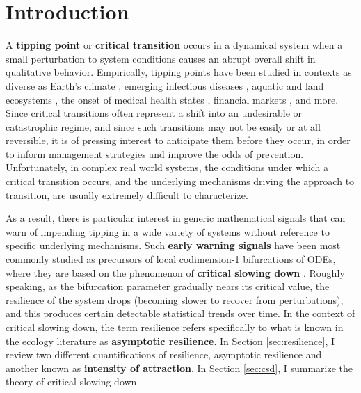 
\section{Introduction}
\label{sec:intro}

A \textbf{tipping point} or \textbf{critical transition} occurs in a dynamical system when a small perturbation to system conditions causes an abrupt overall shift in qualitative behavior. 
%
Empirically, tipping points have been studied in contexts as diverse as 
Earth's climate \cite{lentonTippingElementsEarth2008, dakosSlowingEarlyWarning2008a}, 
emerging infectious diseases \cite{brettDynamicalFootprintsEnable2020}, 
aquatic and land ecosystems \cite{schefferCatastrophicShiftsEcosystems2001, carpenterRisingVarianceLeading2006}, 
the onset of medical health states \cite{mcsharryPredictionEpilepticSeizures2003, venegasSelforganizedPatchinessAsthma2005}, 
financial markets \cite{gatfaouiFlickeringInformationSpreading2019},
and more. %
%
Since critical transitions often represent a shift into an undesirable or catastrophic regime, and since such transitions may not be easily or at all reversible, %
it is of pressing interest to anticipate them before they occur, in order to inform management strategies and improve the odds of prevention. Unfortunately, in complex real world systems, the conditions under which a critical transition occurs, and the underlying mechanisms driving the approach to transition, are usually extremely difficult to characterize.

As a result, there is particular interest in generic mathematical signals that can warn of impending tipping in a wide variety of systems without reference to specific underlying mechanisms. Such \textbf{early warning signals} have been most commonly studied as precursors of local codimension-1 bifurcations of ODEs, where they are based on the phenomenon of \textbf{critical slowing down} \cite{schefferEarlywarningSignalsCritical2009}. Roughly speaking, as the bifurcation parameter gradually nears its critical value, the resilience of the system drops (becoming slower to recover from perturbations), and this produces certain detectable statistical trends over time. In the context of critical slowing down, the term resilience refers specifically to what is known in the ecology literature as \textbf{asymptotic resilience}. In Section \ref{sec:resilience}, I review two different quantifications of resilience, asymptotic resilience and another known as \textbf{intensity of attraction}. In Section \ref{sec:csd}, I summarize the theory of critical slowing down. 

